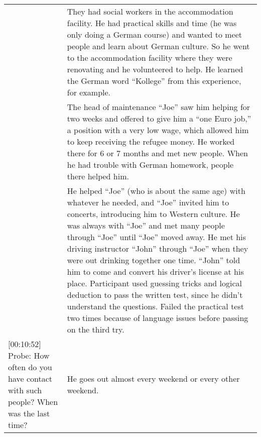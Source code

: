 \begin{longtable}{p{}p{}}
                                                                                                                                                                & They had social workers in the accommodation facility. He had practical skills and time (he was only doing a German course) and wanted to meet people and learn about German culture. So he went to the accommodation facility where they were renovating and he volunteered to help. He learned the German word ``Kollege'' from this experience, for example.                                                                                                                                                                                                                                     \\
                                                                                                                                                                & The head of maintenance ``Joe'' saw him helping for two weeks and offered to give him a ``one Euro job,'' a position with a very low wage, which allowed him to keep receiving the refugee money. He worked there for 6 or 7 months and met new people. When he had trouble with German homework, people there helped him.                                                                                                                                                                                                                                                                          \\
                                                                                                                                                                & He helped ``Joe'' (who is about the same age) with whatever he needed, and ``Joe'' invited him to concerts, introducing him to Western culture. He was always with ``Joe'' and met many people through ``Joe'' until ``Joe'' moved away. He met his driving instructor ``John'' through ``Joe'' when they were out drinking together one time. ``John'' told him to come and convert his driver's license at his place. Participant used guessing tricks and logical deduction to pass the written test, since he didn't understand the questions. Failed the practical test two times because of language issues before passing on the third try. \\
{[}00:10:52{]} Probe: How often do you have contact with such people? When was the last time?                                                                   & He goes out almost every weekend or every other weekend.                                                                                                                                                                                                                                                                                                                                                                                                                                                                                                                                        \\

\end{longtable}

